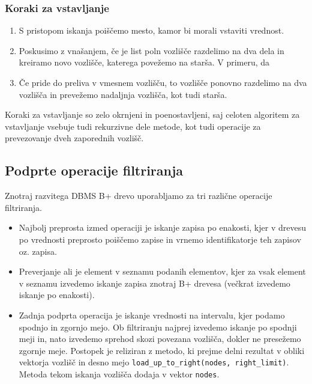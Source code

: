 \documentclass[a4paper,12pt,openright]{book}
\begin{document}
        \subsubsection{Koraki za vstavljanje}

        \begin{enumerate}
            \item S pristopom iskanja poiščemo mesto, kamor bi morali vstaviti vrednost.
            \item Poskusimo z vnašanjem, če je list poln vozlišče razdelimo na dva dela in kreiramo novo vozlišče, katerega povežemo na starša. V primeru, da 
            \item Če pride do preliva v vmesnem vozlišču, to vozlišče ponovno razdelimo na dva vozlišča in prevežemo nadaljnja vozlišča, kot tudi starša.
        \end{enumerate}

        \noindent
        Koraki za vstavljanje so zelo okrnjeni in poenostavljeni, saj celoten algoritem za vstavljanje vsebuje tudi rekurzivne dele metode, kot tudi operacije za prevezovanje dveh zaporednih vozlišč.

        \subsection{Podprte operacije filtriranja}
        
        Znotraj razvitega DBMS B+ drevo uporabljamo za tri različne operacije filtriranja.
        \begin{itemize}
            \item Najbolj preprosta izmed operaciji je iskanje zapisa po enakosti, kjer v drevesu po vrednosti preprosto poiščemo zapise in vrnemo identifikatorje teh zapisov oz. zapisa.
            \item Preverjanje ali je element v seznamu podanih elementov, kjer za vsak element v seznamu izvedemo iskanje zapisa znotraj B+ drevesa (večkrat izvedemo iskanje po enakosti).
            \item Zadnja podprta operacija je iskanje vrednosti na intervalu, kjer podamo spodnjo in zgornjo mejo. Ob filtriranju najprej izvedemo iskanje po spodnji meji in, nato izvedemo sprehod skozi povezana vozlišča, dokler ne presežemo zgornje meje. Postopek je reliziran z metodo, ki prejme delni rezultat v obliki vektorja vozlišč in desno mejo {\tt load\_up\_to\_right(nodes, right\_limit)}. Metoda tekom iskanja vozlišča dodaja v vektor {\tt nodes}.
        \end{itemize}
\end{document}
